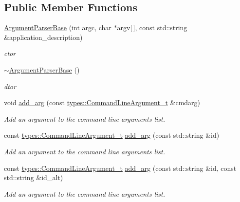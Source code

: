 \subsection*{Public Member Functions}
\begin{DoxyCompactItemize}
\item 
\hyperlink{classcppargparse_1_1parser_1_1ArgumentParserBase_a91c5c101e21966fb8c04c094b04b8ba3}{Argument\+Parser\+Base} (int argc, char $\ast$argv\mbox{[}$\,$\mbox{]}, const std\+::string \&application\+\_\+description)
\begin{DoxyCompactList}\small\item\em c\textquotesingle{}tor \end{DoxyCompactList}\item 
\hyperlink{classcppargparse_1_1parser_1_1ArgumentParserBase_a160867551ad33fceb69f9e920e3e4c23}{$\sim$\+Argument\+Parser\+Base} ()
\begin{DoxyCompactList}\small\item\em d\textquotesingle{}tor \end{DoxyCompactList}\item 
void \hyperlink{classcppargparse_1_1parser_1_1ArgumentParserBase_a2e1cc11e023a40d31881832331faa4b3}{add\+\_\+arg} (const \hyperlink{structcppargparse_1_1types_1_1CommandLineArgument__t}{types\+::\+Command\+Line\+Argument\+\_\+t} \&cmdarg)
\begin{DoxyCompactList}\small\item\em Add an argument to the command line arguments list. \end{DoxyCompactList}\item 
const \hyperlink{structcppargparse_1_1types_1_1CommandLineArgument__t}{types\+::\+Command\+Line\+Argument\+\_\+t} \hyperlink{classcppargparse_1_1parser_1_1ArgumentParserBase_a96ada5337bcd8898f630f83c9ecac523}{add\+\_\+arg} (const std\+::string \&id)
\begin{DoxyCompactList}\small\item\em Add an argument to the command line arguments list. \end{DoxyCompactList}\item 
const \hyperlink{structcppargparse_1_1types_1_1CommandLineArgument__t}{types\+::\+Command\+Line\+Argument\+\_\+t} \hyperlink{classcppargparse_1_1parser_1_1ArgumentParserBase_a4a0c6460abc3808c017de576052fa131}{add\+\_\+arg} (const std\+::string \&id, const std\+::string \&id\+\_\+alt)
\begin{DoxyCompactList}\small\item\em Add an argument to the command line arguments list. \end{DoxyCompactList}\item 

\end{DoxyCompactItemize}
